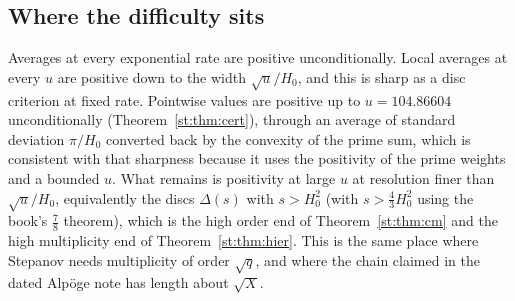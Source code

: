 \subsection{Where the difficulty sits}
Averages at every exponential rate are positive unconditionally. Local averages at every $u$ are positive down to the width $\sqrt u/H_0$, and this is sharp as a disc criterion at fixed rate. Pointwise values are positive up to $u=104.86604$ unconditionally (Theorem~\ref{st:thm:cert}), through an average of standard deviation $\pi/H_0$ converted back by the convexity of the prime sum, which is consistent with that sharpness because it uses the positivity of the prime weights and a bounded $u$. What remains is positivity at large $u$ at resolution finer than $\sqrt u/H_0$, equivalently the discs $\Delta(s)$ with $s>H_0^2$ (with $s>\tfrac43H_0^2$ using the book's $\tfrac78$ theorem), which is the high order end of Theorem~\ref{st:thm:cm} and the high multiplicity end of Theorem~\ref{st:thm:hier}. This is the same place where Stepanov needs multiplicity of order $\sqrt q$, and where the chain claimed in the dated Alp\"oge note has length about $\sqrt X$.


